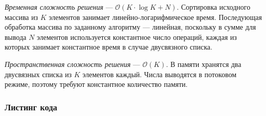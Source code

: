\textit{Временная сложность решения} --- \( \mathcal{O}(K\cdot\log K+N) \). Сортировка исходного массива из \( K \) элементов занимает линейно-логарифмическое время. Последующая обработка массива по заданному алгоритму --- линейная, поскольку в сумме для вывода \( N \) элементов используется константное число операций, каждая из которых занимает константное время в случае двусвязного списка.

\textit{Пространственная сложность решения} --- \( \mathcal{O}(K) \). В памяти хранятся два двусвязных списка из \( K \) элементов каждый. Числа выводятся в потоковом режиме, поэтому требуют константное количество памяти.

\subsubsection{Листинг кода}

